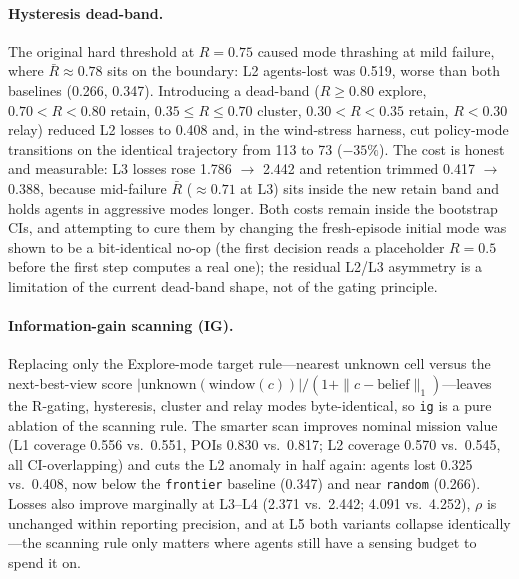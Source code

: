 \documentclass[12pt,a4paper]{article}
\begin{document}
\paragraph{Hysteresis dead-band.} The original hard threshold at
$R = 0.75$ caused mode thrashing at mild failure, where $\bar R \approx 0.78$
sits on the boundary: L2 agents-lost was 0.519, worse than both baselines
(0.266, 0.347). Introducing a dead-band ($R \ge 0.80$ explore,
$0.70 < R < 0.80$ retain, $0.35 \le R \le 0.70$ cluster, $0.30 < R < 0.35$
retain, $R < 0.30$ relay) reduced L2 losses to 0.408 and, in the wind-stress
harness, cut policy-mode transitions on the identical trajectory from 113 to
73 ($-35\%$). The cost is honest and measurable: L3 losses rose 1.786 $\to$
2.442 and retention trimmed 0.417 $\to$ 0.388, because mid-failure $\bar R$
($\approx 0.71$ at L3) sits inside the new retain band and holds agents in
aggressive modes longer. Both costs remain inside the bootstrap CIs, and
attempting to cure them by changing the fresh-episode initial mode was shown
to be a bit-identical no-op (the first decision reads a placeholder $R = 0.5$
before the first step computes a real one); the residual L2/L3 asymmetry is a
limitation of the current dead-band shape, not of the gating principle.

\paragraph{Information-gain scanning (IG).}
\label{sec:ig}
Replacing only the Explore-mode target rule---nearest unknown cell versus the
next-best-view score $|\mathrm{unknown}(\mathrm{window}(c))| / (1 + \|c -
\mathrm{belief}\|_1)$---leaves the R-gating, hysteresis, cluster and relay
modes byte-identical, so \texttt{ig} is a pure ablation of the scanning rule.
The smarter scan improves nominal mission value (L1 coverage 0.556 vs.~0.551,
POIs 0.830 vs.~0.817; L2 coverage 0.570 vs.~0.545, all CI-overlapping) and
cuts the L2 anomaly in half again: agents lost 0.325 vs.~0.408, now below the
\texttt{frontier} baseline (0.347) and near \texttt{random} (0.266). Losses
also improve marginally at L3--L4 (2.371 vs.~2.442; 4.091 vs.~4.252), $\rho$
is unchanged within reporting precision, and at L5 both variants collapse
identically---the scanning rule only matters where agents still have a sensing
budget to spend it on.
\end{document}
